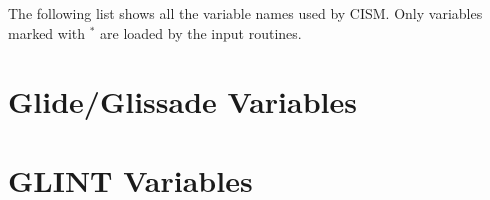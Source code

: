 \label{ug.sec.varlist}
The following list shows all the variable names used by CISM. Only variables marked with $^\ast$ are loaded by the input routines.
\section{Glide/Glissade Variables}

%
\section{GLINT Variables}

